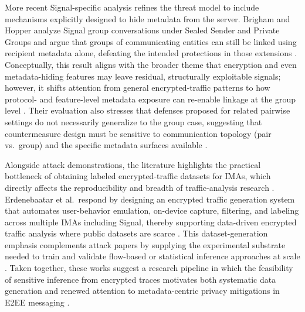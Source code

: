 More recent Signal-specific analysis refines the threat model to include mechanisms explicitly designed to hide metadata from the server. Brigham and Hopper analyze Signal group conversations under Sealed Sender and Private Groups and argue that groups of communicating entities can still be linked using recipient metadata alone, defeating the intended protections in those extensions \cite{brigham2025}. Conceptually, this result aligns with the broader theme that encryption and even metadata-hiding features may leave residual, structurally exploitable signals; however, it shifts attention from general encrypted-traffic patterns to how protocol- and feature-level metadata exposure can re-enable linkage at the group level \cite{brigham2025}. Their evaluation also stresses that defenses proposed for related pairwise settings do not necessarily generalize to the group case, suggesting that countermeasure design must be sensitive to communication topology (pair vs.\ group) and the specific metadata surfaces available \cite{brigham2025}.

Alongside attack demonstrations, the literature highlights the practical bottleneck of obtaining labeled encrypted-traffic datasets for IMAs, which directly affects the reproducibility and breadth of traffic-analysis research \cite{erdenebaatar2023}. Erdenebaatar et al.\ respond by designing an encrypted traffic generation system that automates user-behavior emulation, on-device capture, filtering, and labeling across multiple IMAs including Signal, thereby supporting data-driven encrypted traffic analysis where public datasets are scarce \cite{erdenebaatar2023}. This dataset-generation emphasis complements attack papers by supplying the experimental substrate needed to train and validate flow-based or statistical inference approaches at scale \cite{erdenebaatar2023,bozorgi2023}. Taken together, these works suggest a research pipeline in which the feasibility of sensitive inference from encrypted traces \cite{bozorgi2023,brigham2025} motivates both systematic data generation \cite{erdenebaatar2023} and renewed attention to metadata-centric privacy mitigations in E2EE messaging \cite{oppliger2020}.


